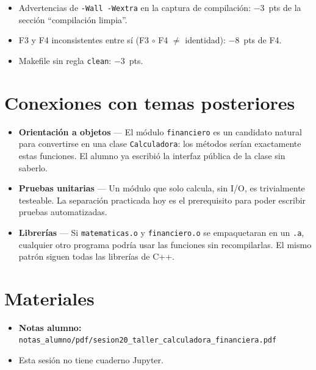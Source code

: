 \documentclass[12pt, oneside]{article}
\begin{document}
\begin{notaprofesor}
  \begin{itemize}
    \item Advertencias de \texttt{-Wall -Wextra} en la captura de
          compilación: $-3$~pts de la sección ``compilación limpia''.
    \item F3 y F4 inconsistentes entre sí (F3 $\circ$ F4 $\neq$
          identidad): $-8$~pts de F4.
    \item Makefile sin regla \texttt{clean}: $-3$~pts.
  \end{itemize}
\end{notaprofesor}

\section{Conexiones con temas posteriores}

\begin{itemize}
  \item \textbf{Orientación a objetos} — El módulo \texttt{financiero}
        es un candidato natural para convertirse en una clase
        \texttt{Calculadora}: los métodos serían exactamente estas
        funciones.  El alumno ya escribió la interfaz pública de la clase
        sin saberlo.
  \item \textbf{Pruebas unitarias} — Un módulo que solo calcula, sin I/O,
        es trivialmente testeable.  La separación practicada hoy es el
        prerequisito para poder escribir pruebas automatizadas.
  \item \textbf{Librerías} — Si \texttt{matematicas.o} y
        \texttt{financiero.o} se empaquetaran en un \texttt{.a}, cualquier
        otro programa podría usar las funciones sin recompilarlas.
        El mismo patrón siguen todas las librerías de C++.
\end{itemize}

\section{Materiales}

\begin{itemize}
  \item \textbf{Notas alumno:}
        \texttt{notas\_alumno/pdf/sesion20\_taller\_calculadora\_financiera.pdf}
  \item Esta sesión no tiene cuaderno Jupyter.
\end{itemize}
\end{document}
